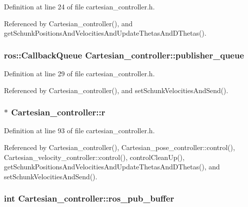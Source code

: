 Definition at line 24 of file cartesian\-\_\-controller.\-h.



Referenced by Cartesian\-\_\-controller(), and get\-Schunk\-Positions\-And\-Velocities\-And\-Update\-Thetas\-And\-D\-Thetas().

\hypertarget{classCartesian__controller_a041a2eb6657c9b036a512fb21e9f5086}{
\subsubsection[{publisher\-\_\-queue}]{\setlength{\rightskip}{0pt plus 5cm}ros\-::\-Callback\-Queue Cartesian\-\_\-controller\-::publisher\-\_\-queue\hspace{0.3cm}{\ttfamily [protected]}}}\label{classCartesian__controller_a041a2eb6657c9b036a512fb21e9f5086}


Definition at line 29 of file cartesian\-\_\-controller.\-h.



Referenced by Cartesian\-\_\-controller(), and set\-Schunk\-Velocities\-And\-Send().

\hypertarget{classCartesian__controller_a5562129951bd802e4ded77fc716c87a0}{
\subsubsection[{r}]{$\ast$ Cartesian\-\_\-controller\-::r}}\label{classCartesian__controller_a5562129951bd802e4ded77fc716c87a0}


Definition at line 93 of file cartesian\-\_\-controller.\-h.



Referenced by Cartesian\-\_\-controller(), Cartesian\-\_\-pose\-\_\-controller\-::control(), Cartesian\-\_\-velocity\-\_\-controller\-::control(), control\-Clean\-Up(), get\-Schunk\-Positions\-And\-Velocities\-And\-Update\-Thetas\-And\-D\-Thetas(), and set\-Schunk\-Velocities\-And\-Send().

\hypertarget{classCartesian__controller_ab9ed5a808da204dbc612d313dc7332f4}{
\subsubsection[{ros\-\_\-pub\-\_\-buffer}]{\setlength{\rightskip}{0pt plus 5cm}int Cartesian\-\_\-controller\-::ros\-\_\-pub\-\_\-buffer\hspace{0.3cm}{\ttfamily [protected]}}}\label{classCartesian__controller_ab9ed5a808da204dbc612d313dc7332f4}


